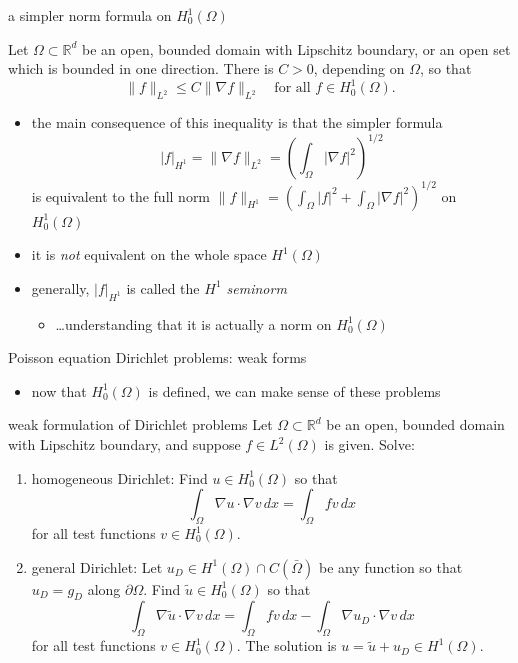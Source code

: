\documentclass[10pt,
               svgnames,
               hyperref={colorlinks,
                         citecolor=DeepPink4,
                         linkcolor=FireBrick,
                         urlcolor=blue},
               usepdftitle=false]{beamer}
\newcommand{\RR}{\mathbb{R}}
\newcommand{\grad}{\nabla}
\begin{document}
\begin{frame}{a simpler norm formula on $H_0^1(\Omega)$}

\begin{theorem}
Let $\Omega\subset \RR^d$ be an open, bounded domain with Lipschitz boundary, or an open set which is bounded in one direction.  There is $C>0$, depending on $\Omega$, so that
	$$\|f\|_{L^2} \le C \|\grad f\|_{L^2} \quad \text{for all } f\in H_0^1(\Omega).$$
\end{theorem}

\begin{itemize}
\item the main consequence of this inequality is that the simpler formula
	$$|f|_{H^1} = \|\grad f\|_{L^2} = \left(\int_\Omega |\grad f|^2\right)^{1/2}$$
is equivalent to the full norm $\|f\|_{H^1} = \left(\int_\Omega |f|^2 + \int_\Omega |\grad f|^2\right)^{1/2}$ on $H_0^1(\Omega)$
\item it is \emph{not} equivalent on the whole space $H^1(\Omega)$
\item generally, $|f|_{H^1}$ is called the \emph{$H^1$ seminorm}
    \begin{itemize}
    \item[$\circ$] \dots understanding that it is actually a norm on $H_0^1(\Omega)$
    \end{itemize}
\end{itemize}
\end{frame}

\begin{frame}{Poisson equation Dirichlet problems: weak forms}

\begin{itemize}
\item now that $H_0^1(\Omega)$ is defined, we can make sense of these problems
\end{itemize}

\begin{block}{weak formulation of Dirichlet problems}
Let $\Omega\subset \RR^d$ be an open, bounded domain with Lipschitz boundary, and suppose $f\in L^2(\Omega)$ is given.  Solve:
\begin{enumerate}
\item \alert{homogeneous Dirichlet}: Find $u\in H_0^1(\Omega)$ so that
    $$\int_\Omega \grad u \cdot \grad v\,dx = \int_\Omega f v\,dx$$
for all test functions $v\in H_0^1(\Omega)$.
\item \alert{general Dirichlet}: Let $u_D \in H^1(\Omega) \cap C(\bar\Omega)$ be any function so that $u_D=g_D$ along $\partial\Omega$.  Find $\tilde u\in H_0^1(\Omega)$ so that
    $$\int_\Omega \grad \tilde u \cdot \grad v\,dx = \int_\Omega f v\,dx - \int_\Omega \grad u_D \cdot \grad v\,dx$$
for all test functions $v\in H_0^1(\Omega)$.  The solution is $u=\tilde u + u_D \in H^1(\Omega)$.
\end{enumerate}
\end{block}
\end{frame}
\end{document}
